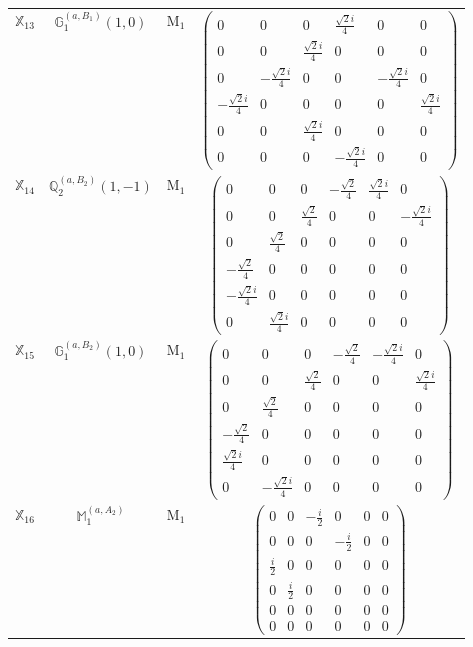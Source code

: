 \documentclass[fleqn,10pt,landscape]{article}
\begin{document}
\begin{itemize}
\begin{center}
\begin{longtable}{c|c|c|c}
$ \mathbb{X}_{13} $ & $\mathbb{G}_{1}^{(a,B_{1})}(1,0)$ & M$_{1}$ & $\begin{pmatrix} 0 & 0 & 0 & \frac{\sqrt{2} i}{4} & 0 & 0 \\ 0 & 0 & \frac{\sqrt{2} i}{4} & 0 & 0 & 0 \\ 0 & - \frac{\sqrt{2} i}{4} & 0 & 0 & - \frac{\sqrt{2} i}{4} & 0 \\ - \frac{\sqrt{2} i}{4} & 0 & 0 & 0 & 0 & \frac{\sqrt{2} i}{4} \\ 0 & 0 & \frac{\sqrt{2} i}{4} & 0 & 0 & 0 \\ 0 & 0 & 0 & - \frac{\sqrt{2} i}{4} & 0 & 0 \end{pmatrix}$ \\
$ \mathbb{X}_{14} $ & $\mathbb{Q}_{2}^{(a,B_{2})}(1,-1)$ & M$_{1}$ & $\begin{pmatrix} 0 & 0 & 0 & - \frac{\sqrt{2}}{4} & \frac{\sqrt{2} i}{4} & 0 \\ 0 & 0 & \frac{\sqrt{2}}{4} & 0 & 0 & - \frac{\sqrt{2} i}{4} \\ 0 & \frac{\sqrt{2}}{4} & 0 & 0 & 0 & 0 \\ - \frac{\sqrt{2}}{4} & 0 & 0 & 0 & 0 & 0 \\ - \frac{\sqrt{2} i}{4} & 0 & 0 & 0 & 0 & 0 \\ 0 & \frac{\sqrt{2} i}{4} & 0 & 0 & 0 & 0 \end{pmatrix}$ \\
$ \mathbb{X}_{15} $ & $\mathbb{G}_{1}^{(a,B_{2})}(1,0)$ & M$_{1}$ & $\begin{pmatrix} 0 & 0 & 0 & - \frac{\sqrt{2}}{4} & - \frac{\sqrt{2} i}{4} & 0 \\ 0 & 0 & \frac{\sqrt{2}}{4} & 0 & 0 & \frac{\sqrt{2} i}{4} \\ 0 & \frac{\sqrt{2}}{4} & 0 & 0 & 0 & 0 \\ - \frac{\sqrt{2}}{4} & 0 & 0 & 0 & 0 & 0 \\ \frac{\sqrt{2} i}{4} & 0 & 0 & 0 & 0 & 0 \\ 0 & - \frac{\sqrt{2} i}{4} & 0 & 0 & 0 & 0 \end{pmatrix}$ \\
$ \mathbb{X}_{16} $ & $\mathbb{M}_{1}^{(a,A_{2})}$ & M$_{1}$ & $\begin{pmatrix} 0 & 0 & - \frac{i}{2} & 0 & 0 & 0 \\ 0 & 0 & 0 & - \frac{i}{2} & 0 & 0 \\ \frac{i}{2} & 0 & 0 & 0 & 0 & 0 \\ 0 & \frac{i}{2} & 0 & 0 & 0 & 0 \\ 0 & 0 & 0 & 0 & 0 & 0 \\ 0 & 0 & 0 & 0 & 0 & 0 \end{pmatrix}$ \\

\end{longtable}
\end{center}
\end{itemize}
\end{document}
